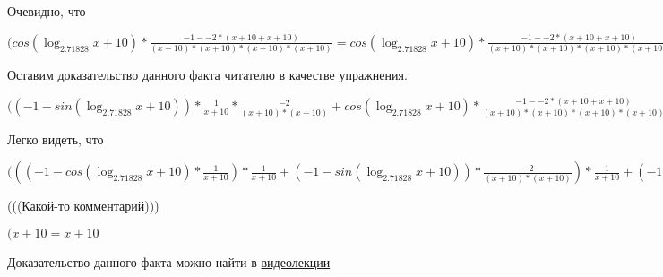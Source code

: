 \documentclass[12pt,a4paper,fleqn]{article}
\theoremstyle{definition}
\begin{document}
Очевидно, что

$(cos(\log_{ 2.71828 }{ x  +  10 }) * \frac{ -1  -  -2  * ( x  +  10  +  x  +  10 )}{( x  +  10 ) * ( x  +  10 ) * ( x  +  10 ) * ( x  +  10 )}
 = cos(\log_{ 2.71828 }{ x  +  10 }) * \frac{ -1  -  -2  * ( x  +  10  +  x  +  10 )}{( x  +  10 ) * ( x  +  10 ) * ( x  +  10 ) * ( x  +  10 )}
$

Оставим доказательство данного факта читателю в качестве упражнения.

$(( -1  - sin(\log_{ 2.71828 }{ x  +  10 })) * \frac{ 1 }{ x  +  10 }
 * \frac{ -2 }{( x  +  10 ) * ( x  +  10 )}
 + cos(\log_{ 2.71828 }{ x  +  10 }) * \frac{ -1  -  -2  * ( x  +  10  +  x  +  10 )}{( x  +  10 ) * ( x  +  10 ) * ( x  +  10 ) * ( x  +  10 )}
 = ( -1  - sin(\log_{ 2.71828 }{ x  +  10 })) * \frac{ 1 }{ x  +  10 }
 * \frac{ -2 }{( x  +  10 ) * ( x  +  10 )}
 + cos(\log_{ 2.71828 }{ x  +  10 }) * \frac{ -1  -  -2  * ( x  +  10  +  x  +  10 )}{( x  +  10 ) * ( x  +  10 ) * ( x  +  10 ) * ( x  +  10 )}
$

Легко видеть, что

$((( -1  - cos(\log_{ 2.71828 }{ x  +  10 }) * \frac{ 1 }{ x  +  10 }
) * \frac{ 1 }{ x  +  10 }
 + ( -1  - sin(\log_{ 2.71828 }{ x  +  10 })) * \frac{ -2 }{( x  +  10 ) * ( x  +  10 )}
) * \frac{ 1 }{ x  +  10 }
 + ( -1  - sin(\log_{ 2.71828 }{ x  +  10 })) * \frac{ 1 }{ x  +  10 }
 * \frac{ -2 }{( x  +  10 ) * ( x  +  10 )}
 + ( -1  - sin(\log_{ 2.71828 }{ x  +  10 })) * \frac{ 1 }{ x  +  10 }
 * \frac{ -2 }{( x  +  10 ) * ( x  +  10 )}
 + cos(\log_{ 2.71828 }{ x  +  10 }) * \frac{ -1  -  -2  * ( x  +  10  +  x  +  10 )}{( x  +  10 ) * ( x  +  10 ) * ( x  +  10 ) * ( x  +  10 )}
 = (( -1  - cos(\log_{ 2.71828 }{ x  +  10 }) * \frac{ 1 }{ x  +  10 }
) * \frac{ 1 }{ x  +  10 }
 + ( -1  - sin(\log_{ 2.71828 }{ x  +  10 })) * \frac{ -2 }{( x  +  10 ) * ( x  +  10 )}
) * \frac{ 1 }{ x  +  10 }
 + ( -1  - sin(\log_{ 2.71828 }{ x  +  10 })) * \frac{ 1 }{ x  +  10 }
 * \frac{ -2 }{( x  +  10 ) * ( x  +  10 )}
 + ( -1  - sin(\log_{ 2.71828 }{ x  +  10 })) * \frac{ 1 }{ x  +  10 }
 * \frac{ -2 }{( x  +  10 ) * ( x  +  10 )}
 + cos(\log_{ 2.71828 }{ x  +  10 }) * \frac{ -1  -  -2  * ( x  +  10  +  x  +  10 )}{( x  +  10 ) * ( x  +  10 ) * ( x  +  10 ) * ( x  +  10 )}
$

(((Какой-то комментарий)))

$( x  +  10  =  x  +  10 $

Доказательство данного факта можно найти в \href{https://www.youtube.com/watch?v=dQw4w9WgXcQ}{видеолекции}
\end{document}
